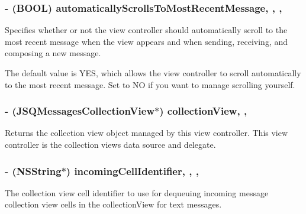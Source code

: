 \subsubsection[{automatically\+Scrolls\+To\+Most\+Recent\+Message}]{\setlength{\rightskip}{0pt plus 5cm}-\/ (B\+O\+O\+L) automatically\+Scrolls\+To\+Most\+Recent\+Message\hspace{0.3cm}{\ttfamily [read]}, {\ttfamily [write]}, {\ttfamily [nonatomic]}, {\ttfamily [assign]}}\label{interface_j_s_q_messages_view_controller_a19a60a139ad222e77c6d2e266672c9bd}
Specifies whether or not the view controller should automatically scroll to the most recent message when the view appears and when sending, receiving, and composing a new message.

The default value is {\ttfamily Y\+E\+S}, which allows the view controller to scroll automatically to the most recent message. Set to {\ttfamily N\+O} if you want to manage scrolling yourself. \hypertarget{interface_j_s_q_messages_view_controller_a31c7589123a872e88cdbb530a953069a}{}
\subsubsection[{collection\+View}]{\setlength{\rightskip}{0pt plus 5cm}-\/ ({\bf J\+S\+Q\+Messages\+Collection\+View}$\ast$) collection\+View\hspace{0.3cm}{\ttfamily [read]}, {\ttfamily [nonatomic]}, {\ttfamily [weak]}}\label{interface_j_s_q_messages_view_controller_a31c7589123a872e88cdbb530a953069a}
Returns the collection view object managed by this view controller. This view controller is the collection view\textquotesingle{}s data source and delegate. \hypertarget{interface_j_s_q_messages_view_controller_aff50b7f5fd7e55c0bf19a72079b3ce98}{}
\subsubsection[{incoming\+Cell\+Identifier}]{\setlength{\rightskip}{0pt plus 5cm}-\/ (N\+S\+String$\ast$) incoming\+Cell\+Identifier\hspace{0.3cm}{\ttfamily [read]}, {\ttfamily [write]}, {\ttfamily [nonatomic]}, {\ttfamily [copy]}}\label{interface_j_s_q_messages_view_controller_aff50b7f5fd7e55c0bf19a72079b3ce98}
The collection view cell identifier to use for dequeuing incoming message collection view cells in the collection\+View for text messages.

